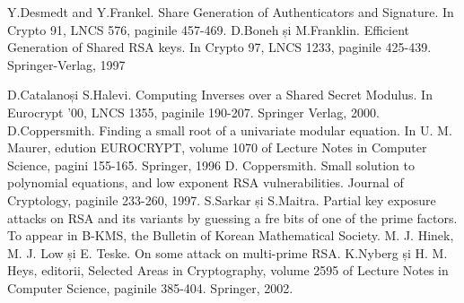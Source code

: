 \documentclass[12]{report}
\begin{document}
\medskip


\begin{thebibliography}{9}
Y.Desmedt and Y.Frankel. Share Generation of Authenticators and Signature. In Crypto 91, LNCS 576, paginile 457-469.
D.Boneh și M.Franklin. Efficient Generation of Shared RSA keys. In Crypto 97, LNCS 1233, paginile 425-439. Springer-Verlag, 1997

D.Catalanoși S.Halevi. Computing Inverses over a Shared Secret Modulus. In Eurocrypt '00, LNCS 1355, paginile 190-207. Springer Verlag, 2000.
D.Coppersmith. Finding a small root of a univariate modular equation. In U. M. Maurer, edution EUROCRYPT, volume 1070 of Lecture Notes in Computer Science, pagini 155-165. Springer, 1996
D. Coppersmith. Small solution to polynomial equations, and low exponent RSA vulnerabilities. Journal of Cryptology, paginile 233-260, 1997.
S.Sarkar și S.Maitra. Partial key exposure attacks on RSA and its variants by guessing a fre bits of one of the prime factors. To appear in B-KMS, the Bulletin of Korean Mathematical Society.
M. J. Hinek, M. J. Low și E. Teske. On some attack on multi-prime RSA. K.Nyberg și H. M. Heys, editorii, Selected Areas in Cryptography, volume 2595 of Lecture Notes in Computer Science, paginile 385-404. Springer, 2002.

\end{thebibliography}
\end{document}
